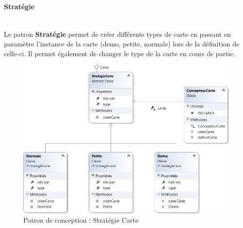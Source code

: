 \documentclass[a4paper,11pt]{article}
\begin{document}
\paragraph{Stratégie}\mbox{}\medskip\\
Le patron \textbf{Stratégie} permet de créer différents types de carte en passant en paramètre l'instance de la carte (demo, petite, normale) lors de la définition de celle-ci. Il permet également de changer le type de la carte en cours de partie.
\begin{figure}[H]
	\centering
	\includegraphics[width=\textwidth]{fig/strategie_carte}
	\caption{Patron de conception : Stratégie Carte}
	\label{pc:sc}
\end{figure}
\end{document}
